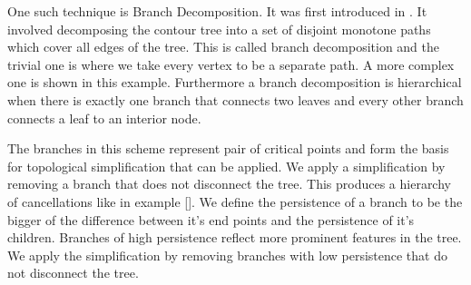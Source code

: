 One such technique is Branch Decomposition. It was first introduced in \cite{ct-branch-decomp}. It involved decomposing the contour tree into a set of disjoint monotone paths which cover all edges of the tree. This is called branch decomposition and the trivial one is where we take every vertex to be a separate path. A more complex one is shown in this example. Furthermore a branch decomposition is hierarchical when there is exactly one branch that connects two leaves and every other branch connects a leaf to an interior node.

The branches in this scheme represent pair of critical points and form the basis for topological simplification that can be applied. We apply a simplification by removing a branch that does not disconnect the tree. This produces a hierarchy of cancellations like in example []. We define the persistence of a branch to be the bigger of the difference between it's end points and the persistence of it's children. Branches of high persistence reflect more prominent features in the tree. We apply the simplification by removing branches with low persistence that do not disconnect the tree.

